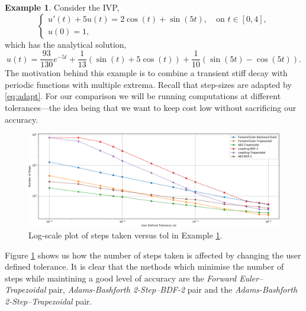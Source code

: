 \documentclass[12pt, twoside]{report}
\theoremstyle{plain}
\theoremstyle{definition}
\theoremstyle{definition}
\newtheorem{example}{Example}[chapter]
\begin{document}
        \begin{example}
        \label{4_example_3}
            Consider the IVP,
            \begin{equation}
            \label{eq:4_ex_3}
                \begin{cases}
                    u'(t) + 5u(t) = 2\cos(t) + \sin(5t), \quad 
                    \text{on } t \in [0,4],\\
                    u(0) = 1,
                \end{cases}
            \end{equation}
            which has the analytical solution,
            \begin{equation}
                u(t) = \frac{93}{130} e^{-5t} + 
                \frac{1}{13}\left ( \sin(t) + 5\cos(t)  \right) +
                \frac{1}{10}\left ( \sin(5t) - \cos(5t) \right).
            \end{equation}
            The motivation behind this example is to combine a transient stiff
            decay with periodic functions with multiple extrema. Recall that 
            step-sizes are adapted by \eqref{eq:adapt}. For our comparison we 
            will be running computations at different tolerances---the idea
            being that we want to keep cost low without sacrificing our 
            accuracy. 
        \end{example}
        \begin{figure}[H]
            \centering
                \includegraphics[width=0.9\columnwidth]{3_steps_vs_tol}
                \caption{Log-scale plot of steps taken versus tol in Example 
                \ref{4_example_3}.}
                \label{4_ex3_steps}
        \end{figure}

        Figure \ref{4_ex3_steps} shows us how the number of steps taken is
        affected by changing the user defined tolerance. It is clear that 
        the methods which minimise the number of steps while maintining a good
        level of accuracy are the \textit{Forward Euler--Trapezoidal} pair, 
        \textit{Adams-Bashforth 2-Step--BDF-2} pair and the 
        \textit{Adams-Bashforth 2-Step--Trapezoidal} pair. 
\end{document}
